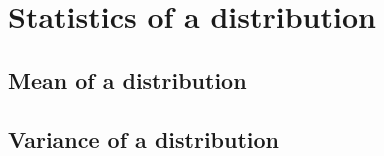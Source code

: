 \section{Statistics of a distribution}

	\subsection{Mean of a distribution}
	
	\subsection{Variance of a distribution}
	